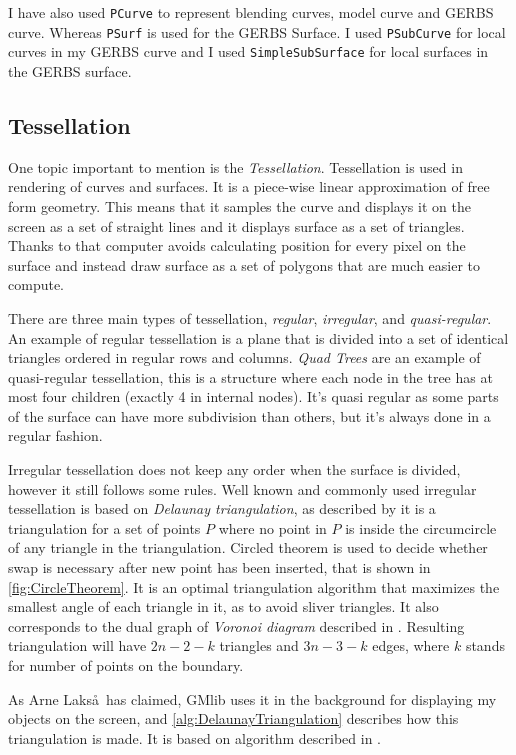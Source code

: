 \documentclass[a4paper,12pt]{extarticle}
\begin{document}
I have also used \verb|PCurve| to represent blending curves, model curve and GERBS curve. Whereas \verb|PSurf| is used for the GERBS Surface. I used \verb|PSubCurve| for local curves in my GERBS curve and I used \verb|SimpleSubSurface| for local surfaces in the GERBS surface.

\subsection{Tessellation}
One topic important to mention is the \emph{Tessellation}. Tessellation is used in rendering of curves and surfaces. It is a piece-wise linear approximation of free form geometry. This means that it samples the curve and displays it on the screen as a set of straight lines and it displays surface as a set of triangles. Thanks to that computer avoids calculating position for every pixel on the surface and instead draw surface as a set of polygons that are much easier to compute.

There are three main types of tessellation, \emph{regular}, \emph{irregular}, and \emph{quasi-regular}. An example of regular tessellation is a plane that is divided into a set of identical triangles ordered in regular rows and columns. \emph{Quad Trees} are an example of quasi-regular tessellation, this is a structure where each node in the tree has at most four children (exactly 4 in internal nodes). It's quasi regular as some parts of the surface can have more subdivision than others, but it's always done in a regular fashion.

Irregular tessellation does not keep any order when the surface is divided, however it still follows some rules. Well known and commonly used irregular tessellation is based on \emph{Delaunay triangulation}, as described by \citep[Chap 9.2]{Schwarzkopf1997} it is a triangulation for a set of points $P$ where no point in $P$ is inside the circumcircle of any triangle in the triangulation. Circled theorem is used to decide whether swap is necessary after new point has been inserted, that is shown in \cref{fig:CircleTheorem}. It is an optimal triangulation algorithm that maximizes the smallest angle of each triangle in it, as to avoid sliver triangles. It also corresponds to the dual graph of \emph{Voronoi diagram} described in \citep[Chap 7.1]{Schwarzkopf1997}. Resulting triangulation will have $2n-2-k$ triangles and $3n-3-k$ edges, where $k$ stands for number of points on the boundary.

As Arne Laks\aa\, has claimed, GMlib uses it in the background for displaying my objects on the screen, and \cref{alg:DelaunayTriangulation} describes how this triangulation is made. It is based on algorithm described in \citep[Chapter 9.3]{Schwarzkopf1997}.
\end{document}
